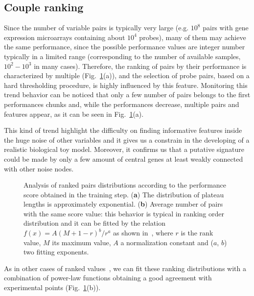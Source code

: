 \documentclass{standalone}
\begin{document}
\subsection[Ranking]{Couple ranking}\label{synapse:ranking}

Since the number of variable pairs is typically very large (e.g. $10^8$ pairs with gene expression microarrays containing about $10^4$ probes), many of them may achieve the same performance, since the possible performance values are integer number typically in a limited range (corresponding to the number of available samples, $10^2-10^3$ in many cases).
Therefore, the ranking of pairs by their performance is characterized by multiple  (Fig.~\ref{fig:plateaus}(a)), and the selection of probe pairs, based on a hard thresholding procedure, is highly influenced by this feature.
Monitoring this trend behavior can be noticed that only a few number of pairs belongs to the first performances chunks and, while the performances decrease, multiple pairs and features appear, as it can be seen in Fig.~\ref{fig:plateaus}(a).

This kind of trend highlight the difficulty on finding informative features inside the huge noise of other variables and it gives us a constrain in the developing of a realistic biological toy model.
Moreover, it confirms us that a putative signature could be made by only a few amount of central genes at least weakly connected with other noise nodes.

\begin{figure}[htbp]
\centering
\def\svgwidth{0.4\textwidth}

\qquad\qquad
\def\svgwidth{0.4\textwidth}

\caption{Analysis of ranked pairs distributions according to the performance score obtained in the training step.
(\textbf{a}) The distribution of plateau lengths is approximately exponential.
(\textbf{b}) Average number of pairs with the same score value: this behavior is typical in ranking order distribution and it can be fitted by the relation $f(x) = A(M + 1 - r)^b / r^a$ as shown in~\cite{rankfit}, where $r$ is the rank value, $M$ its maximum value, $A$ a normalization constant and ($a$, $b$) two fitting exponents.}
\label{fig:plateaus}
\end{figure}

As in other cases of ranked values~\cite{rankfit}, we can fit these ranking distributions with a combination of power-law functions obtaining a good agreement with experimental points (Fig.~\ref{fig:plateaus}(b)).
\end{document}
